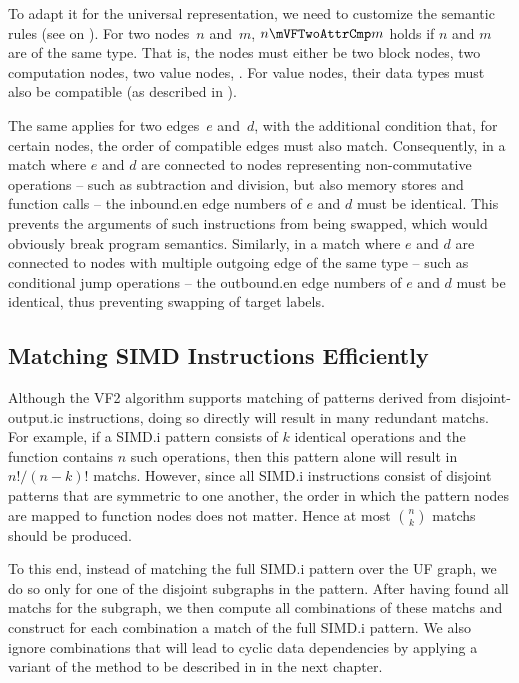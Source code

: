 To adapt it for the \gls{universal representation}, we need to customize the
semantic rules (see  on
).
%
For two \glspl{node}~$n$ and~$m$, \mbox{$n \mVFTwoAttrCmp m$} holds if $n$ and
$m$ are of the same type.
%
That is, the \glspl{node} must either be two \glspl{block node}, two
\glspl{computation node}, two \glspl{value node}, \etc*.
%
For \glspl{value node}, their data types must also be compatible (as described
in ).

The same applies for two \glspl{edge}~$e$ and~$d$, with the additional condition
that, for certain \glspl{node}, the order of compatible \glspl{edge} must also
match.
%
Consequently, in a \gls{match} where $e$ and $d$ are connected to \glspl{node}
representing non-commutative \glspl{operation} -- such as subtraction and
division, but also memory stores and function calls -- the \gls{inbound.en}
\glspl{edge number} of $e$ and $d$ must be identical.
%
This prevents the arguments of such \glspl{instruction} from being swapped,
which would obviously break \gls{program} semantics.
%
Similarly, in a \gls{match} where $e$ and $d$ are connected to \glspl{node} with
multiple outgoing \gls{edge} of the same type -- such as conditional jump
\glspl{operation} -- the \gls{outbound.en} \glspl{edge number} of $e$ and $d$
must be identical, thus preventing swapping of target labels.


\subsection{Matching SIMD Instructions Efficiently}

Although the \gls{VF2} algorithm supports matching of \glspl{pattern} derived
from \gls{disjoint-output.ic} \glspl{instruction}, doing so directly will result
in many redundant \glspl{match}.
%
For example, if a \gls{SIMD.i} \gls{pattern} consists of $k$ identical
\glspl{operation} and the function contains $n$ such \glspl{operation}, then
this \gls{pattern} alone will result in \mbox{$n! / (n - k)!$} \glspl{match}.
%
However, since all \gls{SIMD.i} \glspl{instruction} consist of disjoint
\glspl{pattern} that are symmetric to one another, the order in which the
\gls{pattern} \glspl{node} are mapped to \gls{function} \glspl{node} does not
matter.
%
Hence at most $\binom{n}{k}$ \glspl{match} should be produced.

To this end, instead of matching the full \gls{SIMD.i} \gls{pattern} over the
\gls{UF graph}, we do so only for one of the disjoint \glspl{subgraph} in the
\gls{pattern}.
%
After having found all \glspl{match} for the \gls{subgraph}, we then compute all
combinations of these \glspl{match} and construct for each combination a
\gls{match} of the full \gls{SIMD.i} \gls{pattern}.
%
We also ignore combinations that will lead to cyclic data dependencies by
applying a variant of the method to be described in
 in the next chapter.

